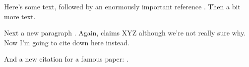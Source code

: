 \documentclass{article}
\begin{document}
Here's some text, followed by an enormously important reference
\cite<here I am obligated to cite>[even though it's not really
necessary]{small}.  Then a bit more text.

Next a new paragraph \cite{big}.  Again,  claims XYZ
although we're not really sure why.  Now I'm going to cite
 down here instead.

And a new citation for a famous paper: \cite{famous}.



\end{document}
